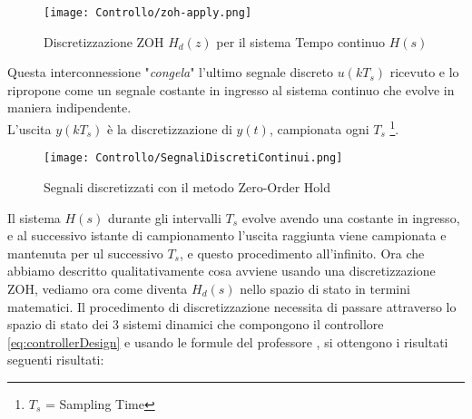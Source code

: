 \begin{figure}[H]
	\centering
	\caption[Discretizzazione Zero-Order Hold  $ H_d(z) $ del sistema Tempo continuo $ H(s) $]{Discretizzazione ZOH $ H_d(z) $ per il sistema Tempo continuo $ H(s) $}
	\texttt{[image: Controllo/zoh-apply.png]}
\end{figure}
\noindent
Questa interconnessione "\textit{congela}" l'ultimo segnale discreto $ u(k T_s) $ ricevuto e lo ripropone come un segnale costante in ingresso al sistema continuo che evolve in maniera indipendente.\\
L'uscita $ y(k T_s) $ è la discretizzazione di $ y(t) $, campionata ogni $ T_s $ \footnote{$ T_s $ = Sampling Time}.
\begin{figure}[H]
	\centering
	\caption[Effetto sui segnali discretizzati con il metodo Zero-Order Hold]{Segnali discretizzati con il metodo Zero-Order Hold}
	\texttt{[image: Controllo/SegnaliDiscretiContinui.png]}
\end{figure}
\noindent
Il sistema $ H(s) $ durante gli intervalli $ T_s $  evolve avendo una costante in ingresso, e al successivo istante di campionamento l'uscita raggiunta viene campionata e mantenuta per ul successivo $ T_s $, e questo procedimento all'infinito.
\newpage
\noindent
Ora che abbiamo descritto qualitativamente cosa avviene usando una discretizzazione ZOH, vediamo ora come diventa $ H_d(s) $ nello spazio di stato in termini matematici. Il procedimento di discretizzazione necessita di passare attraverso lo spazio di stato dei 3 sistemi dinamici che compongono il controllore \ref{eq:controllerDesign} e usando le formule del professore \cite{Discretizzazione}, si ottengono i risultati seguenti risultati:
